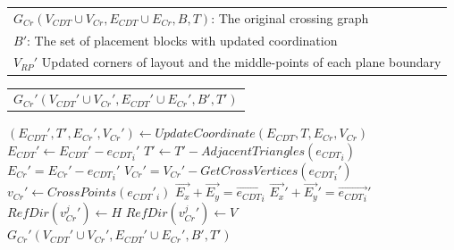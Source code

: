     \newcommand{\CGU}{\ensuremath{\mbox{\sc CrossGraphUpdate}}}
    \begin{algorithm}[t]  
      \caption{$\CGU(G_{Cr},B',V_{RP}')$}\label{alg:CGU}                       
      \begin{scriptsize}
        \begin{algorithmic}[1]
          \REQUIRE 
            \begin{tabular}{l}
              $G_{Cr}(V_{CDT}\cup V_{Cr}, E_{CDT} \cup E_{Cr},B,T)$: The original crossing graph\\
              $B'$: The set of placement blocks with updated coordination \\
              $V_{RP}'$ Updated corners of layout and the middle-points of each plane boundary
            \end{tabular}
          \ENSURE 
            \begin{tabular}{l}
              $G_{Cr}'(V_{CDT}'\cup V_{Cr}',E_{CDT}'\cup E_{Cr}',B',T')$
            \end{tabular}
          \STATE $(E_{CDT}',T',E_{Cr}',V_{Cr}') \gets UpdateCoordinate(E_{CDT},T,E_{Cr},V_{Cr})$
            \label{line:CEUstart}
              \STATE $E_{CDT}' \gets E_{CDT}' - {e_{CDT}}_i'$
              \STATE $T' \gets T' - AdjacentTriangles({e_{CDT}}_i)$
                \STATE $E_{Cr}' = E_{Cr}'- {e_{CDT}}_i'$
                \STATE $V_{Cr}' = V_{Cr}'- GetCrossVertices({e_{CDT}}_i')$
              \ENDIF\label{line:CEUend}
            \ELSE\label{line:RefDirUstart}
              \STATE $v_{Cr}' \gets CrossPoints({e_{CDT}}'_i)$
              \STATE $\overrightarrow{E_x} + \overrightarrow{E_y} = \overrightarrow{{e_{CDT}}_i}$
              \STATE $\overrightarrow{E_x}' + \overrightarrow{E_y}' = \overrightarrow{{e_{CDT}}_i}'$ 
                  \STATE $RefDir({v_{Cr}^j}')\gets H$
                  \STATE $RefDir({v_{Cr}^j}') \gets V$
                \ENDIF
              \ENDFOR
            \ENDIF\label{line:RefDirUend}
          \ENDFOR
          \RETURN $G_{Cr}'(V_{CDT}'\cup V_{Cr}',E_{CDT}'\cup E_{Cr}',B',T')$
        \end{algorithmic}
      \end{scriptsize} 
    \end{algorithm}

